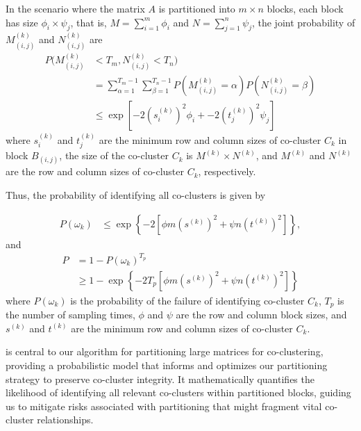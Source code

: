 In the scenario where the matrix $A$ is partitioned into $m \times n$ blocks, each block has size $\phi_i \times \psi_j$, that is, $M=\sum_{i=1}^m \phi_i$ and $N=\sum_{j=1}^n \psi_j$, the joint probability of $M_{(i,j)}^{(k)}$ and $N_{(i,j)}^{(k)}$ are
\begin{align*}
    P(M_{(i,j)}^{(k)} & < T_m, N_{(i,j)}^{(k)} < T_n)                               \\ & = \sum_{\alpha=1}^{T_m-1} \sum_{\beta=1}^{T_n-1} P(M_{(i,j)}^{(k)} = \alpha) P(N_{(i,j)}^{(k)} = \beta) \\
                      & \le \exp[-2 (s_i^{(k)})^2 \phi_i + -2 (t_j^{(k)})^2 \psi_j]
\end{align*}
where $s_i^{(k)}$ and $t_j^{(k)}$ are the minimum row and column sizes of co-cluster $C_k$ in block $B_{(i,j)}$, the size of the co-cluster $C_k$ is $M^{(k)} \times N^{(k)}$, and $M^{(k)}$ and $N^{(k)}$ are the row and column sizes of co-cluster $C_k$, respectively.


Thus, the probability of identifying all co-clusters is given by

\begin{align}
    P(\omega_k) & \le \exp \left\{ -2 [\phi m (s^{(k)})^2 + \psi n (t^{(k)})^2] \right\},
\end{align}
and
\begin{align}
    P & = 1 - P(\omega_k)^{T_p}                                                                                                       \\
      & \ge 1 - \exp \left\{ -2 T_p [\phi m (s^{(k)})^2 + \psi n (t^{(k)})^2] \right\} \label{eq:prob_of_identifying_all_co_clusters}
\end{align}
where $P(\omega_k)$ is the probability of the failure of identifying co-cluster $C_k$, $T_p$ is the number of sampling times, $\phi$ and $\psi$ are the row and column block sizes, and $s^{(k)}$ and $t^{(k)}$ are the minimum row and column sizes of co-cluster $C_k$.


 is central to our algorithm for partitioning large matrices for co-clustering, providing a probabilistic model that informs and optimizes our partitioning strategy to preserve co-cluster integrity. It mathematically quantifies the likelihood of identifying all relevant co-clusters within partitioned blocks, guiding us to mitigate risks associated with partitioning that might fragment vital co-cluster relationships.

